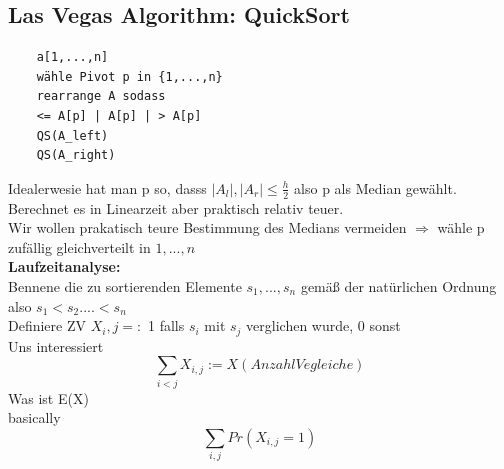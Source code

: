 \documentclass{article}
\begin{document}
\subsection{Las Vegas Algorithm: QuickSort }
\begin{verbatim}
    a[1,...,n]
    wähle Pivot p in {1,...,n}
    rearrange A sodass
    <= A[p] | A[p] | > A[p]
    QS(A_left)
    QS(A_right)
\end{verbatim}
Idealerwesie hat man p so, dasss $|A_l|, |A_r| \leq \frac{h}{2} $ also p als Median gewählt.\\
Berechnet es in Linearzeit aber praktisch relativ teuer. \\
Wir wollen prakatisch teure Bestimmung des Medians vermeiden $\Rightarrow$ wähle p zufällig gleichverteilt in ${1,...,n}$ \\
\textbf{Laufzeitanalyse: }\\
Bennene die zu sortierenden Elemente $s_1,..., s_n$ gemäß der natürlichen Ordnung also $s_1 < s_2.... < s_n$ \\
Definiere ZV $X_i,j =: $ 1 falls $s_i $ mit $s_j$ verglichen wurde, 0 sonst \\
Uns interessiert 
\[
\sum_{i<j} X_{i,j}:= X( Anzahl Vegleiche) 
 \]
 Was ist E(X)\\
 basically
 \[
  \sum_{i,j} Pr(X_{i,j} =1)
 \]
 
\end{document}
